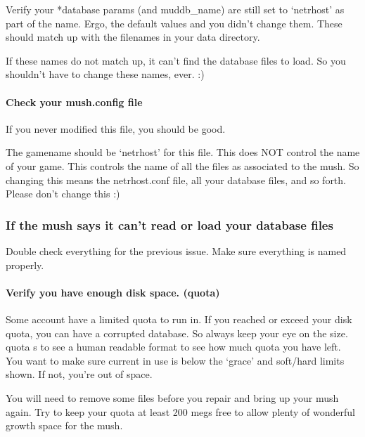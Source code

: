 \documentclass[letterpaper,10pt,english]{sphinxmanual}
\begin{document}
\sphinxAtStartPar
Verify your *database params (and muddb\_name) are still set to ‘netrhost’ as
part of the name.  Ergo, the default values and you didn’t change them.
These should match up with the filenames in your data directory.

\sphinxAtStartPar
If these names do not match up, it can’t find the database files to load.
So you shouldn’t have to change these names, ever. :)


\paragraph{Check your mush.config file}
\label{\detokenize{troubleshooting:check-your-mush-config-file}}
\sphinxAtStartPar
If you never modified this file, you should be good.

\sphinxAtStartPar
The gamename should be ‘netrhost’ for this file.  This does NOT control
the name of your game.  This controls the name of all the files
as associated to the mush.  So changing this means the netrhost.conf
file, all your database files, and so forth.  Please don’t change this :)


\subsubsection{If the mush says it can’t read or load your database files}
\label{\detokenize{troubleshooting:if-the-mush-says-it-can-t-read-or-load-your-database-files}}
\sphinxAtStartPar
Double check everything for the previous issue. Make sure everything is named properly.


\paragraph{Verify you have enough disk space. (quota)}
\label{\detokenize{troubleshooting:verify-you-have-enough-disk-space-quota}}
\sphinxAtStartPar
Some account have a limited quota to run in.  If you reached or exceed
your disk quota, you can have a corrupted database.  So always keep
your eye on the size.  quota \sphinxhyphen{}s to see a human readable format to see
how much quota you have left.  You want to make sure current in use is
below the ‘grace’ and soft/hard limits shown.  If not, you’re out of
space.

\sphinxAtStartPar
You will need to remove some files before you repair and bring up your
mush again.  Try to keep your quota at least 200 megs free to allow
plenty of wonderful growth space for the mush.
\end{document}
